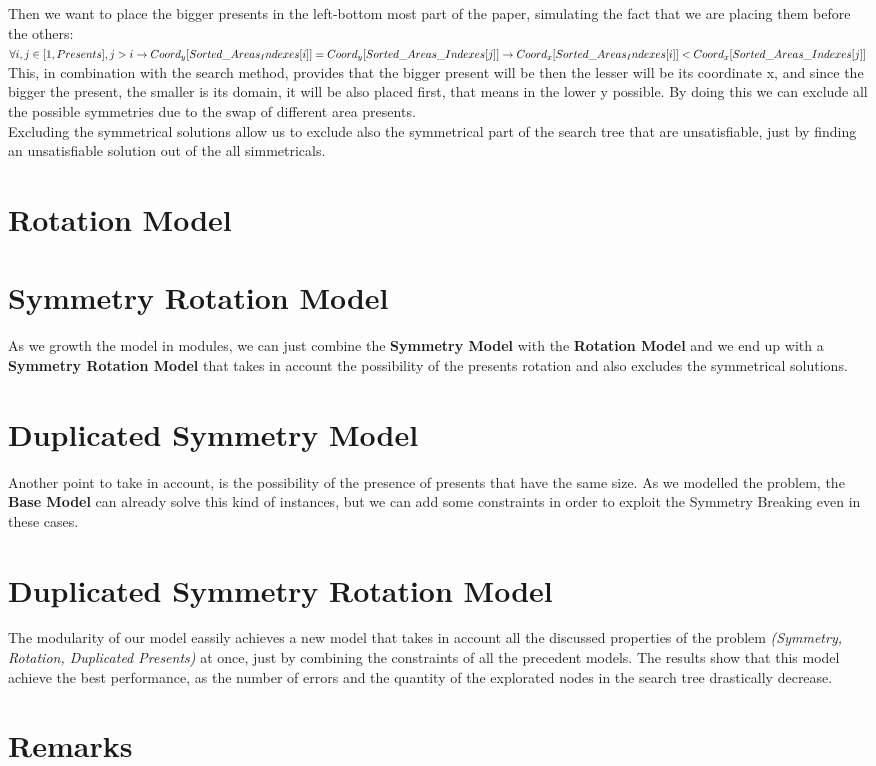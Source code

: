 Then we want to place the bigger presents in the left-bottom most part of the paper, simulating the fact that we are placing them before
the others:\\
$
\forall i, j \in [1, Presents], j > i \rightarrow \\
    Coord_y[Sorted\_Areas_Indexes[i]] = Coord_y[Sorted\_Areas\_Indexes[j]] \rightarrow \\
    Coord_x[Sorted\_Areas_Indexes[i]] < Coord_x[Sorted\_Areas\_Indexes[j]]
$
This, in combination with the search method, provides that the bigger present will be then the lesser will be its coordinate x,
and since the bigger the present, the smaller is its domain, it will be also placed first, that means in the lower y possible.
By doing this we can exclude all the possible symmetries due to the swap of different area presents.\\
Excluding the symmetrical solutions allow us to exclude also the symmetrical part of the search tree that are unsatisfiable, just
by finding an unsatisfiable solution out of the all simmetricals.


\section{Rotation Model}

\section{Symmetry Rotation Model}
As we growth the model in modules, we can just combine the \textbf{Symmetry Model} with the \textbf{Rotation Model} and we end up
with a \textbf{Symmetry Rotation Model} that takes in account the possibility of the presents rotation and also excludes the symmetrical
solutions.

\section{Duplicated Symmetry Model}
Another point to take in account, is the possibility of the presence of presents that have the same size. As we modelled the problem,
the \textbf{Base Model} can already solve this kind of instances, but we can add some constraints in order to exploit the Symmetry Breaking
even in these cases.


\section{Duplicated Symmetry Rotation Model}
The modularity of our model eassily achieves a new model that takes in account all the discussed properties of the problem
\textit{(Symmetry, Rotation, Duplicated Presents)} at once, just by combining the constraints of all the precedent models.
The results show that this model achieve the best performance, as the number of errors and the quantity of the explorated nodes in the
search tree drastically decrease.  

\section{Remarks}
